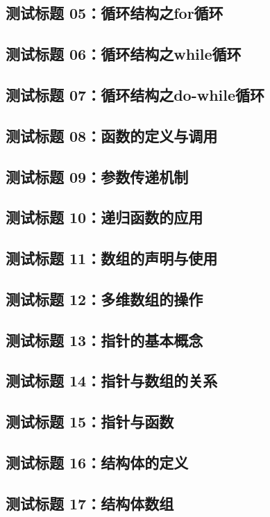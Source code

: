 \subsection{测试标题 05：循环结构之for循环}
\subsection{测试标题 06：循环结构之while循环}
\subsection{测试标题 07：循环结构之do-while循环}
\subsection{测试标题 08：函数的定义与调用}
\subsection{测试标题 09：参数传递机制}
\subsection{测试标题 10：递归函数的应用}
\subsection{测试标题 11：数组的声明与使用}
\subsection{测试标题 12：多维数组的操作}
\subsection{测试标题 13：指针的基本概念}
\subsection{测试标题 14：指针与数组的关系}
\subsection{测试标题 15：指针与函数}
\subsection{测试标题 16：结构体的定义}
\subsection{测试标题 17：结构体数组}
